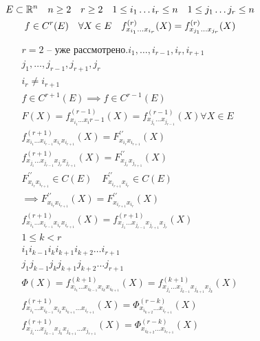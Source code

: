 \documentclass[main]{subfiles}
\begin{document}
    \begin{theorem}
        \begin{gather*}
            E \subset \mathbb{R}^n \quad n \geq 2 \quad r \geq 2 \quad 1 \leq i_1 \ldots i_r \leq n \quad 1 \leq j_1 \ldots j_r \leq n \\
            f \in C^r(E) \quad \forall X \in E \quad f^{(r)}_{x_{i_1} \ldots x_{i_r}}(X) = f^{(r)}_{x_{j_1} \ldots x_{j_r}}(X) 
        \end{gather*}
    \end{theorem}
        \begin{longProof}[по индукции]
            \begin{gather*}
                r = 2 \text{ -- уже  рассмотрено.}
                i_1, \ldots, i_{r-1}, i_r, i_{r+1} \\
                j_1, \ldots, j_{r-1}, j_{r+1}, j_r\\
                i_r \ne i_{r+1} \\
                f \in  C^{r+1}(E) \implies f \in C^{r-1}(E) \\
                F(X) = f^{(r-1)}_{x_{i_1} \ldots x_i{r-1}}(X) = f^{(r-1)}_{x_{j_1} \ldots x_{j_{r-1}}}(X) \forall X \in E \\
                f^{(r+1)}_{x_{i_1} \ldots x_{i_{r-1}} x_{i_r} x_{i_{r+1}}}(X) = F^{\prime\prime}_{x_{i_r} x_{i_{r+1}}}(X) \\
                f^{(r+1)}_{x_{j_1} \ldots x_{j_{r-1}} x_{j_r} x_{j_{r+1}}}(X) = F^{\prime\prime}_{x_{j_r} x_{j_{r+1}}}(X) \\
                F^{\prime\prime}_{x_{i_r} x_{i_{r+1}}} \in C(E) \quad F^{\prime\prime}_{x_{i_{r+1}}x_{i_r}} \in C(E) \\
                \implies F^{\prime\prime}_{x_{i_r}x_{i_{r+1}}}(X) = F^{\prime\prime}_{x_{i_{r+1}} x_{i_r}}(X) \\
                f^{(r+1)}_{x_{i_1} \ldots x_{i_{r-1}} x_{i_r} x_{i_{r+1}}}(X) =  f^{(r+1)}_{x_{j_1} \ldots x_{j_{r-1}} x_{j_{r+1}} x_{j_r}}(X) \\
                1 \leq k < r \\
                i_{1} i_{k-1} i_k i_{k+1} i_{k+2} \ldots i_{r+1} \\
                j_{1} j_{k-1} j_k j_{k+1} j_{k+2} \ldots j_{r+1} \\
                \Phi(X) = f^{(k+1)}_{x_{i_1} \ldots x_{i_{k-1}} x_{i_k} x_{i_{k+1}}}(X) = f^{(k+1)}_{x_{j_1} \ldots x_{j_{k-1}} x_{j_{k+1}} x_{j_k}}(X)  \\
                f^{(r+1)}_{x_{i_1} \ldots x_{i_{k-1}} x_{i_k} x_{i_{k+1}} \ldots x_{i_{r+1}}}(X) = \Phi^{(r-k)}_{x_{i_{k+2}} \ldots x_{i_{r+1}}}(X) \\ 
                f^{(r+1)}_{x_{j_1} \ldots x_{j_{k-1}} x_{j_k} x_{j_{k+1}} \ldots x_{j_{r+1}}}(X) = \Phi^{(r-k)}_{x_{i_{k+2}} \ldots x_{i_{r+1}}}(X) 
            \end{gather*}
        \end{longProof}
\end{document}
